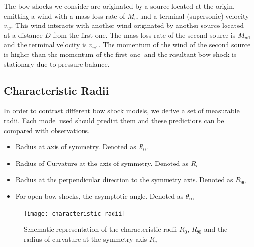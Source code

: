 The bow shocks we consider are originated by a source located at the origin, emitting a wind with a mass loss rate of $\dot{M}_w$ and a terminal
(supersonic) velocity $v_w$. This wind interacts with another wind originated by another source located at a distance $D$ from the first one. 
The mass loss rate of the second source is $\dot{M}_{w1}$ and the terminal velocity is $v_{w1}$. The momentum of the wind of the second source is
higher than the momentum of the first one, and the resultant bow shock is stationary due to pressure balance. 

\subsection{Characteristic Radii}

In order to contrast different bow shock models, we  derive a set of measurable radii. Each model used should predict them and these predictions can be
compared with observations.

\begin{itemize}
\item Radius at axis of symmetry. Denoted as $R_0$. 
\item Radius of Curvature at the axis of symmetry. Denoted as $R_c$
\item Radius at the  perpendicular direction to the symmetry axis. Denoted as $R_{90}$
\item For open bow shocks, the asymptotic angle. Denoted as $\theta_\infty$
\end{itemize} 

\begin{figure}
\texttt{[image: characteristic-radii]}
\caption{Schematic representation of the characteristic radii $R_0$, $R_{90}$ and the radius of curvature at the symmetry axis $R_c$}
\end{figure}



